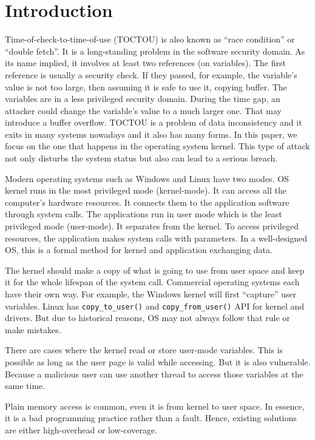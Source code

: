 
\section{Introduction}
\label{sec:introduction}

Time-of-check-to-time-of-use (TOCTOU) is also known as ``race condition'' or ``double fetch''. It is a long-standing problem in the software security domain. As its name implied, it involves at least two references (on variables). The first reference is usually a security check.  If they passed, for example, the variable's value is not too large,  then assuming it is safe to use it, copying buffer. The variables are in a less privileged security domain. During the time gap,  an attacker could change the variable's value to a much larger one. That may introduce a buffer overflow. TOCTOU is a problem of data inconsistency and it exits in many systems nowadays and it also has many forms. In this paper, we focus on the one that happens in the operating system kernel. This type of attack not only disturbs the system status but also can lead to a serious breach.

Modern operating systems such as Windows and Linux have two modes. OS kernel runs in the most privileged mode (kernel-mode). It can access all the computer's hardware resources. It connects them to the application software through system calls. The applications run in user mode which is the least privileged mode (user-mode). It separates from the kernel. To access privileged resources, the application makes system calls with parameters. In a well-designed OS, this is a formal method for kernel and application exchanging data.


The kernel should make a copy of what is going to use from user space and keep it for the whole lifespan of the system call.  Commercial operating systems each have their own way. For example, the Windows kernel will first ``capture'' user variables. Linux has \texttt{copy\_to\_user()} and \texttt{copy\_from\_user()} API for kernel and drivers. But due to historical reasons, OS may not always follow that rule or make mistakes.

There are cases where the kernel read or store user-mode variables. This is possible as long as the user page is valid while accessing. But it is also vulnerable. Because a malicious user can use another thread to access those variables at the same time. 

Plain memory access is common, even it is from kernel to user space. In essence, it is a bad programming practice rather than a fault. Hence, existing solutions are either high-overhead or low-coverage.

